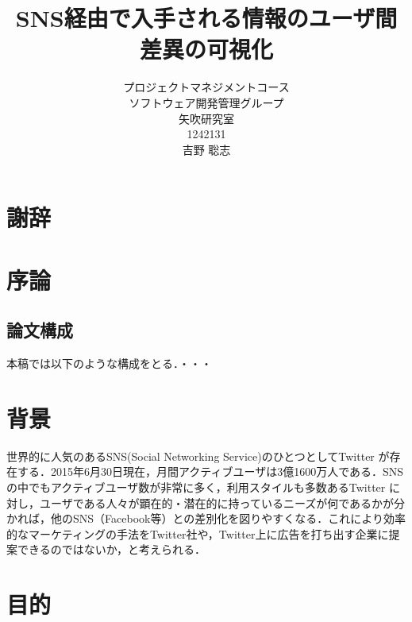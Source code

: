 ﻿\usepackage{here}
\usepackage{ascmac}
\usepackage{here}
\usepackage{txfonts}
\usepackage{listings, jlisting}
\renewcommand{\lstlistingname}{リスト}
\lstset{
  basicstyle=\ttfamily,
  commentstyle=\textit,
  classoffset=1,
  keywordstyle=\bfseries,
  frame=single,
  framesep=5pt,
  showstringspaces=false,
  numbers=left,
  stepnumber=1,
  numberstyle=\tiny,
  tabsize=2,
  breaklines=true
}



\title{SNS経由で入手される情報のユーザ間差異の可視化}
\author{プロジェクトマネジメントコース\\
ソフトウェア開発管理グループ\\
矢吹研究室\\
1242131\\
吉野 聡志}
\date{}

\maketitle

\chapter*{謝辞}

\tableofcontents%

\chapter{序論}

\section{論文構成}
本稿では以下のような構成をとる．・・・

\chapter{背景}
世界的に人気のあるSNS(Social Networking Service)のひとつとしてTwitter が存在する．2015年6月30日現在，月間アクティブユーザは3億1600万人である．SNSの中でもアクティブユーザ数が非常に多く，利用スタイルも多数あるTwitter に対し，ユーザである人々が顕在的・潜在的に持っているニーズが何であるかが分かれば，他のSNS（Facebook等）との差別化を図りやすくなる．これにより効率的なマーケティングの手法をTwitter社や，Twitter上に広告を打ち出す企業に提案できるのではないか，と考えられる．

\chapter{目的}

